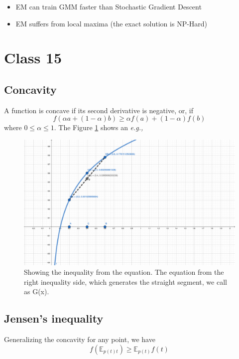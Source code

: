 \documentclass{article}
\newcommand{\eg}{\textit{e.g.,}}
\begin{document}
\begin{itemize}
    \item EM can train GMM faster than Stochastic Gradient Descent
    \item EM suffers from local maxima (the exact solution is NP-Hard)
\end{itemize}

\section{Class 15}
\subsection{Concavity}
A function is concave if its second derivative is negative, or, if 
\begin{equation}
    f(\alpha a + (1 - \alpha)b) \geq \alpha f(a) + (1 - \alpha)f(b)
\end{equation}
where $0 \leq \alpha \leq 1$. The Figure \ref{fig:inequality} shows an \eg
\begin{figure}[!t]
    \centering
    \includegraphics[width=\textwidth]{geogebra.pdf}
    \caption{Showing the inequality from the equation. The equation from the right inequality side, which generates the straight segment, we call as G(x).}
    \label{fig:inequality}
\end{figure}

\subsection{Jensen's inequality} 
Generalizing the concavity for any point, we have 
\begin{equation}
    f(\mathbb{E}_{p(t)t}) \geq \mathbb{E}_{p(t)}f(t)
\end{equation}
\end{document}
